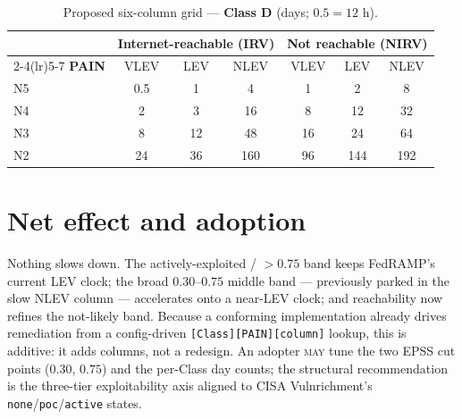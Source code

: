 \documentclass[11pt]{article}
\newcommand{\code}[1]{\texttt{#1}}
\newcommand{\rfckw}[1]{\textsc{#1}}
\begin{document}
\begin{table}[H]
\centering
\footnotesize
\renewcommand{\arraystretch}{1.2}
\begin{tabular}{l ccc ccc}
\toprule
& \multicolumn{3}{c}{\textbf{Internet-reachable (IRV)}} & \multicolumn{3}{c}{\textbf{Not reachable (NIRV)}} \\
\cmidrule(lr){2-4}\cmidrule(lr){5-7}
\textbf{PAIN} & VLEV & LEV & NLEV & VLEV & LEV & NLEV \\
\midrule
N5 & 0.5 & 1  & 4   & 1  & 2   & 8 \\
N4 & 2   & 3  & 16  & 8  & 12  & 32 \\
N3 & 8   & 12 & 48  & 16 & 24  & 64 \\
N2 & 24  & 36 & 160 & 96 & 144 & 192 \\
\bottomrule
\end{tabular}
\caption{Proposed six-column grid --- \textbf{Class D} (days; $0.5 = 12$ h).}
\label{tab:d}
\end{table}

\section{Net effect and adoption}
Nothing slows down. The actively-exploited / $>0.75$ band keeps FedRAMP's current LEV
clock; the broad $0.30$--$0.75$ middle band --- previously parked in the slow NLEV
column --- accelerates onto a near-LEV clock; and reachability now refines the
not-likely band. Because a conforming implementation already drives remediation from a
config-driven \code{[Class][PAIN][column]} lookup, this is additive: it adds columns,
not a redesign. An adopter \rfckw{may} tune the two EPSS cut points ($0.30$, $0.75$)
and the per-Class day counts; the structural recommendation is the three-tier
exploitability axis aligned to CISA Vulnrichment's \code{none}/\code{poc}/\code{active}
states.
\end{document}
